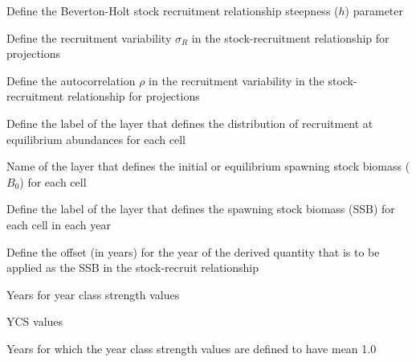  {Define the Beverton-Holt stock recruitment relationship steepness ($h$) parameter}

 {Define the recruitment variability $\sigma_R$ in the stock-recruitment relationship for projections}

 {Define the autocorrelation $\rho$ in the recruitment variability in the stock-recruitment relationship for projections}

 {Define the label of the layer that defines the distribution of recruitment at equilibrium abundances for each cell}

 {Name of the layer that defines the initial or equilibrium spawning stock biomass ($B_0$) for each cell}

 {Define the label of the layer that defines the spawning stock biomass (SSB) for each cell in each year}

 {Define the offset (in years) for the year of the derived quantity that is to be applied as the SSB in the stock-recruit relationship}

 {Years for year class strength values}

 {YCS values}

 {Years for which the year class strength values are defined to have mean 1.0}

\TODOend

\subsubsection[Ageing process]{}

